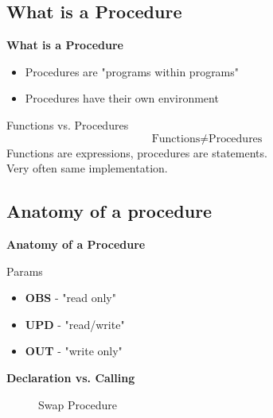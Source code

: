
\subsection*{What is a Procedure}
\begin{frame}{\textbf{What is a Procedure}}
    \begin{itemize}
        \item Procedures are "programs within programs"
        \item Procedures have their own environment
    \end{itemize}
    \begin{alertblock}{Functions vs. Procedures}
        \begin{equation}
            \text{Functions} \neq \text{Procedures}
        \end{equation}
        Functions are expressions, procedures are statements.\\
        Very often same implementation.
    \end{alertblock}
\end{frame}

\subsection*{Anatomy of a procedure}
\begin{frame}{\textbf{Anatomy of a Procedure}}
    \begin{figure}
        
    \end{figure}
    \begin{block}{Params}
        \begin{itemize}
            \item \textbf{OBS} - "read only"
            \item \textbf{UPD} - "read/write"
            \item \textbf{OUT} - "write only"
        \end{itemize}
    \end{block}
\end{frame}

\begin{frame}{\textbf{Declaration vs. Calling}}
    \begin{figure}
        
        \label{fig:ex1}
        \caption{Swap Procedure}
    \end{figure}
\end{frame}

